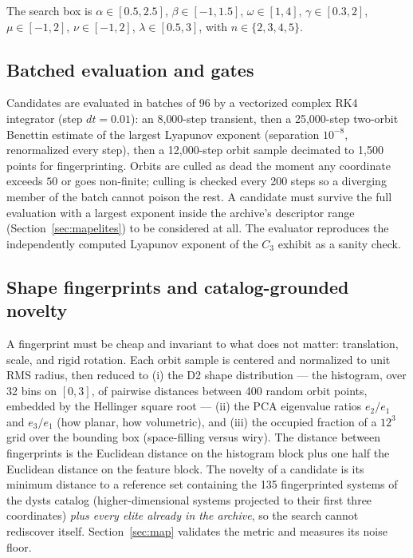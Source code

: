 \documentclass[11pt]{article}
\begin{document}
The search box is $\alpha\in[0.5,2.5]$, $\beta\in[-1,1.5]$,
$\omega\in[1,4]$, $\gamma\in[0.3,2]$, $\mu\in[-1,2]$, $\nu\in[-1,2]$,
$\lambda\in[0.5,3]$, with $n \in \{2,3,4,5\}$.

\subsection{Batched evaluation and gates}\label{sec:eval}

Candidates are evaluated in batches of 96 by a vectorized complex RK4
integrator (step $dt=0.01$): an 8{,}000-step transient, then a
25{,}000-step two-orbit Benettin estimate of the largest Lyapunov
exponent (separation $10^{-8}$, renormalized every step), then a
12{,}000-step orbit sample decimated to 1{,}500 points for
fingerprinting. Orbits are culled as dead the moment any coordinate
exceeds $50$ or goes non-finite; culling is checked every 200 steps so a
diverging member of the batch cannot poison the rest. A candidate must
survive the full evaluation with a largest exponent inside the archive's
descriptor range (Section~\ref{sec:mapelites}) to be considered at all.
The evaluator reproduces the independently computed Lyapunov exponent of
the $C_3$ exhibit as a sanity check.

\subsection{Shape fingerprints and catalog-grounded novelty}\label{sec:fingerprint}

A fingerprint must be cheap and invariant to what does not matter:
translation, scale, and rigid rotation. Each orbit sample is centered and
normalized to unit RMS radius, then reduced to (i) the D2 shape
distribution \citep{osada2002} --- the histogram, over 32 bins on
$[0,3]$, of pairwise distances between 400 random orbit points, embedded
by the Hellinger square root --- (ii) the PCA eigenvalue ratios
$e_2/e_1$ and $e_3/e_1$ (how planar, how volumetric), and (iii) the
occupied fraction of a $12^3$ grid over the bounding box (space-filling
versus wiry). The distance between fingerprints is the Euclidean distance
on the histogram block plus one half the Euclidean distance on the
feature block. The novelty of a candidate is its minimum distance to a
reference set containing the 135 fingerprinted systems of the
\textsf{dysts} catalog \citep{gilpin2021} (higher-dimensional systems
projected to their first three coordinates) \emph{plus every elite
already in the archive}, so the search cannot rediscover itself.
Section~\ref{sec:map} validates the metric and measures its noise floor.
\end{document}

